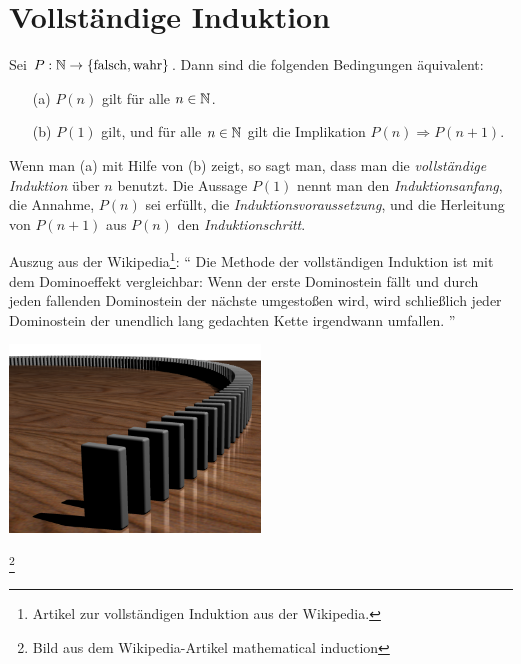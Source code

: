 

\section{Vollständige Induktion}

\begin{framed} 
Sei $P : \mathbb N \to \{ \operatorname{falsch}, \operatorname{wahr} \}$. Dann sind die folgenden Bedingungen äquivalent:
  \begin{itemize}
  	\item[(a)] $P(n)$ gilt für alle $n \in \mathbb N$.
  	\item[(b)] $P(1)$ gilt, und für alle $n \in \mathbb N$ gilt die Implikation $P(n) \Rightarrow P(n+1)$. 
  \end{itemize} 
\end{framed} 

\begin{bem}
Wenn man (a) mit Hilfe von (b) zeigt, so sagt man, dass man die \emph{vollständige Induktion} über $n$ benutzt. Die Aussage $P(1)$ nennt man den \emph{Induktionsanfang}, die Annahme, $P(n)$ sei erfüllt, die \emph{Induktionsvoraussetzung}, und die Herleitung von $P(n+1)$ aus $P(n)$ den \emph{Induktionschritt}. 
\end{bem} 

\begin{bem}
	Auszug aus der Wikipedia\footnote{Artikel zur vollständigen Induktion aus der Wikipedia.}: 
	``
	Die Methode der vollständigen Induktion ist mit dem Dominoeffekt vergleichbar: Wenn der erste Dominostein fällt und durch jeden fallenden Dominostein der nächste umgestoßen wird, wird schließlich jeder Dominostein der unendlich lang gedachten Kette irgendwann umfallen.
	''
	\begin{center} 
	\includegraphics[width=0.5\textwidth]{content/pics/Dominoeffect.png}
	\end{center} 
	\footnote{Bild aus dem Wikipedia-Artikel mathematical induction}
\end{bem} 

